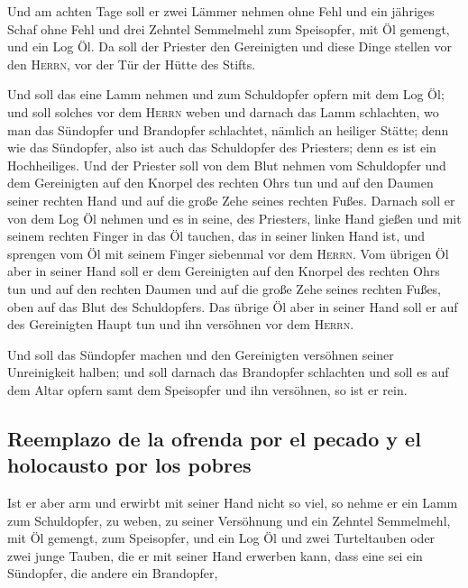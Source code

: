  Und am achten Tage soll er zwei Lämmer nehmen ohne Fehl
und ein jähriges Schaf ohne Fehl und drei Zehntel Semmelmehl zum
Speisopfer, mit Öl gemengt, und ein Log Öl.  Da soll der
Priester den Gereinigten und diese Dinge stellen vor den \textsc{Herrn},
vor der Tür der Hütte des Stifts.

 Und soll das eine Lamm nehmen und zum Schuldopfer opfern
mit dem Log Öl; und soll solches vor dem \textsc{Herrn} weben
 und darnach das Lamm schlachten, wo man das Sündopfer
und Brandopfer schlachtet, nämlich an heiliger Stätte; denn wie das
Sündopfer, also ist auch das Schuldopfer des Priesters; denn es ist ein
Hochheiliges.  Und der Priester soll von dem Blut nehmen
vom Schuldopfer und dem Gereinigten auf den Knorpel des rechten Ohrs tun
und auf den Daumen seiner rechten Hand und auf die große Zehe seines
rechten Fußes.  Darnach soll er von dem Log Öl nehmen und
es in seine, des Priesters, linke Hand gießen  und mit
seinem rechten Finger in das Öl tauchen, das in seiner linken Hand ist,
und sprengen vom Öl mit seinem Finger siebenmal vor dem \textsc{Herrn}.
 Vom übrigen Öl aber in seiner Hand soll er dem
Gereinigten auf den Knorpel des rechten Ohrs tun und auf den rechten
Daumen und auf die große Zehe seines rechten Fußes, oben auf das Blut
des Schuldopfers.  Das übrige Öl aber in seiner Hand soll
er auf des Gereinigten Haupt tun und ihn versöhnen vor dem
\textsc{Herrn}.

 Und soll das Sündopfer machen und den Gereinigten
versöhnen seiner Unreinigkeit halben; und soll darnach das Brandopfer
schlachten  und soll es auf dem Altar opfern samt dem
Speisopfer und ihn versöhnen, so ist er rein.

\hypertarget{reemplazo-de-la-ofrenda-por-el-pecado-y-el-holocausto-por-los-pobres}{%
\subsection{Reemplazo de la ofrenda por el pecado y el holocausto por
los
pobres}\label{reemplazo-de-la-ofrenda-por-el-pecado-y-el-holocausto-por-los-pobres}}

 Ist er aber arm und erwirbt mit seiner Hand nicht so
viel, so nehme er ein Lamm zum Schuldopfer, zu weben, zu seiner
Versöhnung und ein Zehntel Semmelmehl, mit Öl gemengt, zum Speisopfer,
und ein Log Öl  und zwei Turteltauben oder zwei junge
Tauben, die er mit seiner Hand erwerben kann, dass eine sei ein
Sündopfer, die andere ein Brandopfer,

